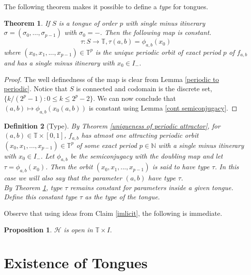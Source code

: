 \documentclass[12pt]{amsart}
\numberwithin{equation}{section}
\newtheorem{theorem}{Theorem}[section]
\newtheorem{proposition}{Proposition}[section]
\newtheorem{definition}[theorem]{Definition}
\theoremstyle{remark}
\begin{document}
\noindent The following theorem makes it possible to define a \textit{type} for tongues.
\begin{theorem}\label{Tongue open}
    If $S$ is a tongue of  order $p$ with single minus itinerary  $\sigma=(\sigma_0,\ldots,\sigma_{p-1})$ with $\sigma_0=-$. Then the following  map is constant.
    \[
    \tau : S \to \mathbb{T}, \tau(a,b)=\phi_{a,b}(x_0)
    \]
    where $(x_0,x_1,...,x_{p-1})\in \mathbb{T}^p$ is the unique periodic orbit of exact period $p$ of $f_{a,b}$ and has a single minus itinerary with $x_0 \in I_-$.
\end{theorem}
\begin{proof}
  
The well definedness of the map is clear from Lemma \ref{periodic to periodic}. Notice that  $S$ is connected and codomain is the discrete set, $\{k/(2^p-1): 0 \leq k \leq 2^p-2 \}$. We can now conclude that $(a,b) \mapsto \phi_{a,b}(x_0(a,b))$ is constant using Lemma \ref{cont semiconjugacy}.
\end{proof}


\begin{definition}[Type]
By Theorem \ref{uniqueness of periodic attractor},     for $(a,b) \in \mathbb{T}\times [0,1]$, $f_{a,b}$ has  atmost one attracting periodic orbit $ (x_0,x_1,...,x_{p-1})\in \mathbb{T}^p$ of some exact period
    $p \in \mathbb{N}$ with a single minus itinerary with $x_0 \in I_-$. Let $\phi_{a,b}$ be the semiconjugacy with the doubling map and let $\tau=\phi_{a,b}(x_0)$. Then the orbit $(x_0,x_1,...,x_{p-1})$ is said to have type $\tau$. In this case we will also say that  the parameter $(a, b)$ have type $\tau$.  \\
   \indent 
   By Theorem \ref{Tongue open}, type $\tau$ remains constant for parameters inside a given tongue. Define this constant type $\tau$ as the type of the tongue.  

\end{definition}

\noindent Observe that using ideas from Claim \ref{imlicit}, the following is immediate.
\begin{proposition}\label{stable componenet open}
    $\mathcal{H}$ is open in $\mathbb{T}\times I.$
\end{proposition}




\section{Existence of Tongues}
\end{document}
